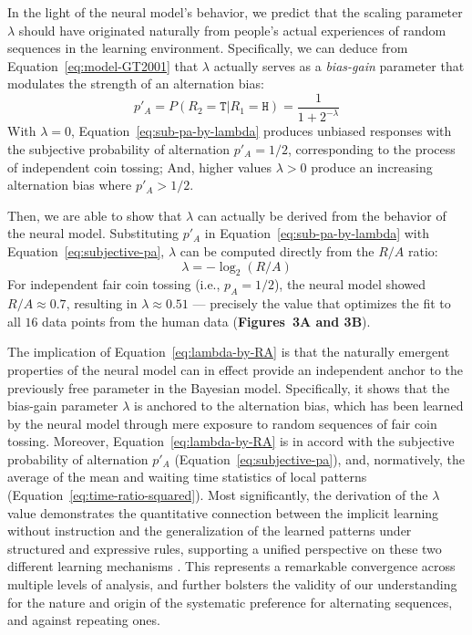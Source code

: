 \documentclass{pnastwo}
\begin{document}
\begin{article}
In the light of the neural model's behavior, we predict that the scaling parameter $\lambda$ should have originated naturally from people's actual experiences of random sequences in the learning environment.
Specifically, we can deduce from Equation~\ref{eq:model-GT2001} that $\lambda$ actually serves as a \emph{bias-gain} parameter that modulates the strength of an alternation bias:
\begin{equation}\label{eq:sub-pa-by-lambda}
  p'_A = P(R_2=\mathtt{T} | R_1=\mathtt{H}) = \frac{1}{1+2^{-\lambda}}
\end{equation}
With $\lambda=0$,  Equation~\ref{eq:sub-pa-by-lambda} produces unbiased responses with the subjective probability of alternation $p'_A = 1/2$, corresponding to the process of independent coin tossing;
And, higher values $\lambda>0$ produce an increasing alternation bias where $p'_A > 1/2$.

Then,  we are able to show that $\lambda$ can actually be derived from the behavior of the neural model.
Substituting $p'_A$ in Equation~\ref{eq:sub-pa-by-lambda} with Equation~\ref{eq:subjective-pa}, $\lambda$ can be computed directly from the $R/A$ ratio:
\begin{equation}\label{eq:lambda-by-RA}
  \lambda = - \log_2(R/A)
\end{equation}
For independent fair coin tossing (i.e., $p_A=1/2$), the neural model showed $R/A \approx 0.7$, resulting in $\lambda \approx 0.51$ ---
precisely the value that optimizes the fit to all $16$ data points from the human data (\textbf{Figures~3A and 3B}).

The implication of Equation~\ref{eq:lambda-by-RA} is that the naturally emergent properties of the neural model can in effect provide an independent anchor to the previously free parameter in the Bayesian model.
Specifically, it shows that the bias-gain parameter $\lambda$ is anchored to the alternation bias, which has been learned by the neural model through mere exposure to random sequences of fair coin tossing.
Moreover, Equation~\ref{eq:lambda-by-RA} is in accord with the subjective probability of alternation $p'_A$ (Equation~\ref{eq:subjective-pa}), and, normatively, the average of the mean and waiting time statistics of local patterns (Equation~\ref{eq:time-ratio-squared}).
Most significantly, the derivation of the $\lambda$ value demonstrates the quantitative connection between the implicit learning without instruction and the generalization of the learned patterns under structured and expressive rules, supporting a unified perspective on these two different learning mechanisms \cite{Aslin2012}.
This represents a remarkable convergence across multiple levels of analysis, and further bolsters the validity of our understanding for the nature and origin of the systematic preference for alternating sequences, and against repeating ones.


\end{article}
\end{document}
